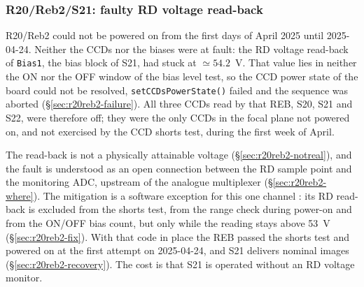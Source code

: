 
\subsubsection{R20/Reb2/S21: faulty RD voltage read-back}
\label{sec:r20reb2}

R20/Reb2 could not be powered on from the first days of April 2025 until
2025-04-24. Neither the CCDs nor the biases were at fault: the RD voltage
read-back of \texttt{Bias1}, the bias block of S21, had stuck at
$\simeq54.2$~V. That value lies in neither the ON nor the OFF window of the
bias level test, so the CCD power state of the board could not be resolved,
\texttt{setCCDsPowerState()} failed and the sequence was aborted
(\S\ref{sec:r20reb2-failure}). All three CCDs read by that REB, S20, S21 and
S22, were therefore off; they were the only CCDs in the focal plane not
powered on, and not exercised by the CCD shorts test, during the first week of
April.

The read-back is not a physically attainable voltage
(\S\ref{sec:r20reb2-notreal}), and the fault is understood as an open
connection between the RD sample point and the monitoring ADC, upstream of the
analogue multiplexer (\S\ref{sec:r20reb2-where}). The mitigation is a software
exception for this one channel \citep{jira:rafts777}: its RD read-back is
excluded from the shorts test, from the range check during power-on and from
the ON/OFF bias count, but only while the reading stays above 53~V
(\S\ref{sec:r20reb2-fix}). With that code in place the REB passed the shorts
test and powered on at the first attempt on 2025-04-24, and S21 delivers
nominal images (\S\ref{sec:r20reb2-recovery}). The cost is that S21 is
operated without an RD voltage monitor.


